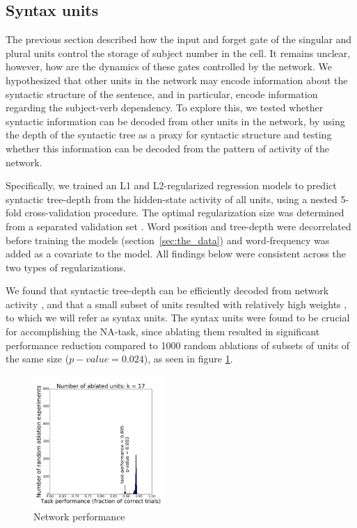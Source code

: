 \subsection{Syntax units}
The previous section described how the input and forget gate of the singular and plural units control the storage of subject number in the cell. It remains unclear, however, how are the dynamics of these gates controlled by the network. We hypothesized that other units in the network may encode information about the syntactic structure of the sentence, and in particular, encode information regarding the subject-verb dependency. To explore this, we tested whether syntactic information can be decoded from other units in the network, by using the depth of the syntactic tree as a proxy for syntactic structure  and testing whether this information can be decoded from the pattern of activity of the network.

Specifically, we trained an L1 and L2-regularized regression models to
predict syntactic tree-depth from the hidden-state activity of all
units, using a nested 5-fold cross-validation procedure. The optimal
regularization size was determined from a separated validation set
. Word position and tree-depth were
decorrelated before training the models (section~\ref{sec:the_data})
and word-frequency was added as a covariate to the model. All findings
below were consistent across the two types of regularizations.

We found that syntactic tree-depth can be efficiently decoded from network activity , and that a small subset of units resulted with relatively high weights , to which we will refer as syntax units. The syntax units were found to be crucial for accomplishing the NA-task, since ablating them resulted in significant performance reduction compared to 1000 random ablations of subsets of units of the same size ($p-value=0.024$), as seen in figure \ref{fig:ablation-syntax}. 

\begin{figure}[h]
    \centering
    \includegraphics[height=5cm]{Figures/null_distribution_ablation_experiment_k_17.png}
    \caption{Network performance}
    \label{fig:ablation-syntax}
\end{figure}

